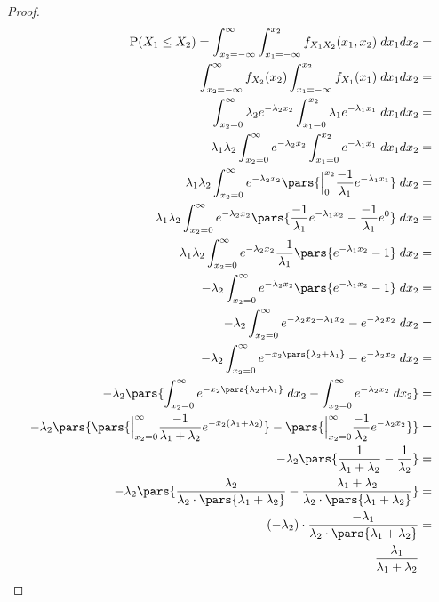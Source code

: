 \begin{proof}
    \begin{align*} 
        \mathrm{P}(X_1 \leq X_2) = \int_{x_2 = -\infty}^{\infty} \int_{x_1 = -\infty}^{x_2} f_{X_{1}X_{2}}(x_1, x_2) \; dx_{1}dx_{2} &= \\ 
        \int_{x_2 = -\infty}^{\infty} f_{X_{2}}(x_2) \int_{x_1 = -\infty}^{x_2} f_{X_1}(x_1) \; dx_{1}dx_{2} &=  \\
        \int_{x_2 = 0}^{\infty} \lambda_2 e^{-\lambda_{2}x_2} \int_{x_1 = 0}^{x_2} \lambda_1 e^{-\lambda_1 x_1} \; dx_{1}dx_{2} &= \\
        \lambda_1 \lambda_2 \int_{x_2 = 0}^{\infty} e^{-\lambda_{2}x_2} \int_{x_1 = 0}^{x_2} e^{-\lambda_1 x_1} \; dx_{1}dx_{2} &= \\ 
        \lambda_1 \lambda_2 \int_{x_2 = 0}^{\infty} e^{-\lambda_{2}x_2} \pars{\Big\rvert_{0}^{x_2} \frac{-1}{\lambda_1} e^{-\lambda_1 x_1} } \;  dx_{2} &= \\ 
        \lambda_1 \lambda_2 \int_{x_2 = 0}^{\infty} e^{-\lambda_{2}x_2} \pars{\frac{-1}{\lambda_1} e^{-\lambda_1 x_2} - \frac{-1}{\lambda_1} e^0} \; dx_2 &= \\ 
        \lambda_1 \lambda_2 \int_{x_2 = 0}^{\infty} e^{-\lambda_2 x_2} \frac{-1}{\lambda_1} \pars{e^{-\lambda_1 x_2} - 1} \; dx_2 &= \\ 
        -\lambda_2 \int_{x_2=0}^{\infty} e^{-\lambda_2 x_2} \pars{e^{-\lambda_1 x_2} - 1} \; dx_2 &= \\ 
        -\lambda_2 \int_{x_2=0}^{\infty} e^{-\lambda_2x_2 - \lambda_1 x_2} - e^{-\lambda_2 x_2} \; dx_2 &= \\ 
         -\lambda_2 \int_{x_2=0}^{\infty} e^{-x_2\pars{\lambda_2 + \lambda_1}} - e^{-\lambda_2 x_2} \; dx_2 &= \\ 
        -\lambda_2 \pars{\int_{x_2=0}^{\infty} e^{-x_2\pars{\lambda_2 + \lambda_1}} \; dx_2 - \int_{x_2=0}^{\infty} e^{-\lambda_2 x_2} \; dx_2} &= \\
        -\lambda_2 \pars{\pars{\Big\rvert_{x_2=0}^{\infty} \frac{-1}{\lambda_1 + \lambda_2} e^{-x_2(\lambda_1 + \lambda_2)}} - \pars{\Big\rvert_{x_2=0}^{\infty} \frac{-1}{\lambda_2} e^{-\lambda_2 x_2}}} &= \\ 
        -\lambda_2 \pars{\frac{1}{\lambda_1 + \lambda_2} - \frac{1}{\lambda_2}} &= \\ 
        -\lambda_2 \pars{\frac{\lambda_2}{\lambda_2 \cdot \pars{\lambda_1 + \lambda_2}} - \frac{\lambda_1 + \lambda_2}{\lambda_2 \cdot \pars{\lambda_1 + \lambda_2}}} &= \\
        (-\lambda_2)\cdot \frac{-\lambda_1}{\lambda_2 \cdot \pars{\lambda_1 + \lambda_2}} &= \\ 
        \frac{\lambda_1}{\lambda_1 + \lambda_2}
    \end{align*}
\end{proof}